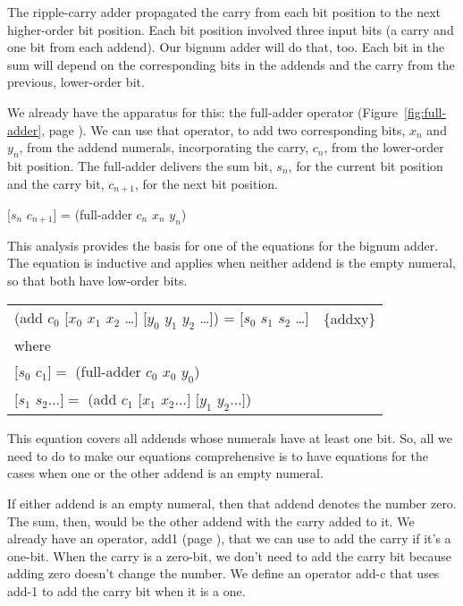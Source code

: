 The ripple-carry adder propagated the carry from each bit position
to the next higher-order bit position.
Each bit position involved three input bits
(a carry and one bit from each addend).
Our bignum adder will do that, too.
Each bit in the sum will depend on the
corresponding bits in the addends and the carry from
the previous, lower-order bit.

We already have the apparatus for this: the full-adder operator
(Figure~\ref{fig:full-adder},  page \pageref{fig:full-adder}).
We can use that operator, to add two corresponding bits,
$x_n$ and $y_n$, from the addend numerals,
incorporating the carry, $c_n$, from the lower-order bit position.
The full-adder delivers the sum bit, $s_n$, for the current
bit position and the carry bit, $c_{n+1}$, for the next bit position.
\begin{center}
[$s_n$ $c_{n+1}$] = (full-adder $c_n$ $x_n$ $y_n$)
\end{center}

This analysis provides the basis for
one of the equations for the bignum adder.
The equation is inductive and applies
when neither addend is the empty numeral,
so that both have low-order bits.

\begin{center}
\begin{tabular}{ll}
(add $c_0$ [$x_0$ $x_1$ $x_2$ \dots ] [$y_0$ $y_1$ $y_2$ \dots ]) = [$s_0$ $s_1$ $s_2$ \dots ]   & \{addxy\} \\
where & \\
$[s_0$ $c_1] =$ (full-adder $c_0$ $x_0$ $y_0$) & \\
$[s_1$ $s_2 \dots ] =$ (add $c_1$ $[x_1$ $x_2 \dots ]$ $[y_1$ $y_2 \dots ]$) & \\
\end{tabular}
\end{center}

This equation covers all addends whose numerals have at least one bit.
So, all we need to do to make our equations comprehensive
is to have equations for the cases when one or the other addend is an empty numeral.

If either addend is an empty numeral, then that addend denotes the number zero.
The sum, then, would be the other addend with the carry added to it.
We already have an operator, add1 (page \pageref{add-1-defun}),
that we can use to add the carry if it's a one-bit.
When the carry is a zero-bit, we don't need to add the carry bit
because adding zero doesn't change the number.
We define an operator add-c that uses add-1 to add the carry bit
when it is a one.

